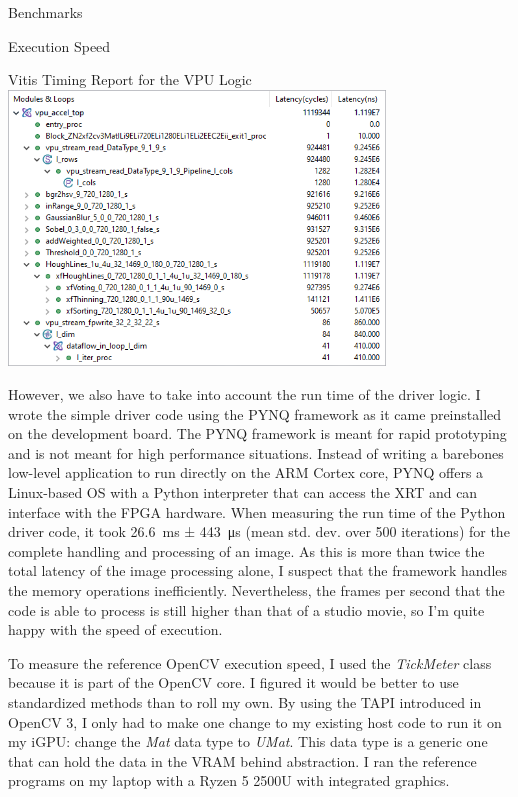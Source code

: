 \documentclass{matthijs}
\begin{document}
\begin{hoofdstuk}{Benchmarks}
\begin{paragraaf}{Execution Speed}
			\begin{figuur}{Vitis Timing Report for the VPU Logic}
				\includegraphics[width=0.75\textwidth]{vitis-timing-bad-quality.png}
			\end{figuur}

			However, we also have to take into account the run time of the driver logic.
			I wrote the simple driver code using the PYNQ framework as it came preinstalled on the development board.
			The PYNQ framework is meant for rapid prototyping and is not meant for high performance situations.
			Instead of writing a barebones low-level application to run directly on the ARM Cortex core, PYNQ offers a Linux-based OS with a Python interpreter that can access the XRT and can interface with the FPGA hardware.
			When measuring the run time of the Python driver code, it took \qty{26.6}{\milli\second} ± \qty{443}{\micro\second} (mean std. dev. over 500 iterations) for the complete handling and processing of an image.
			As this is more than twice the total latency of the image processing alone, I suspect that the framework handles the memory operations inefficiently.
			Nevertheless, the frames per second that the code is able to process is still higher than that of a studio movie, so I'm quite happy with the speed of execution.

			\bigskip

			To measure the reference OpenCV execution speed, I used the \textit{TickMeter} class because it is part of the OpenCV core.
			I figured it would be better to use standardized methods than to roll my own.
			By using the TAPI introduced in OpenCV 3, I only had to make one change to my existing host code to run it on my iGPU: change the \textit{Mat} data type to \textit{UMat}.
			This data type is a generic one that can hold the data in the VRAM behind abstraction.
			I ran the reference programs on my laptop with a Ryzen 5 2500U with integrated graphics.


\end{paragraaf}
\end{hoofdstuk}
\end{document}
